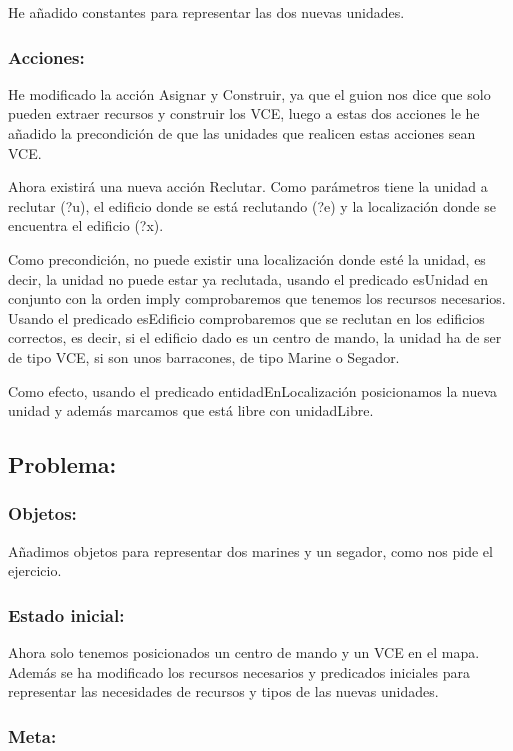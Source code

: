 \documentclass[10pt, spanish]{article}
\begin{document}
He añadido constantes para representar las dos nuevas unidades.


\subsubsection{Acciones:}

He modificado la acción Asignar y Construir, ya que el guion nos dice que solo pueden extraer recursos y construir los VCE, luego a estas dos acciones le he añadido la precondición de que las unidades que realicen estas acciones sean VCE.


Ahora existirá una nueva acción Reclutar. Como parámetros tiene la unidad a reclutar (?u), el edificio donde se está reclutando (?e) y la localización donde se encuentra el edificio (?x).

Como precondición, no puede existir una localización donde esté la unidad, es decir, la unidad no puede estar ya reclutada, usando el predicado esUnidad en conjunto con la orden imply comprobaremos que tenemos los recursos necesarios. Usando el predicado esEdificio comprobaremos que se reclutan en los edificios correctos, es decir, si el edificio dado es un centro de mando, la unidad ha de ser de tipo VCE, si son unos barracones, de tipo Marine o Segador.

Como efecto, usando el predicado entidadEnLocalización posicionamos la nueva unidad y además marcamos que está libre con unidadLibre.


\subsection{Problema:}

\subsubsection{Objetos:}

Añadimos objetos para representar dos marines y un segador, como nos pide el ejercicio.

\subsubsection{Estado inicial:}

Ahora solo tenemos posicionados un centro de mando y un VCE en el mapa. Además se ha modificado los recursos necesarios y predicados iniciales para representar las necesidades de recursos y tipos de las nuevas unidades.

\subsubsection{Meta:}
\end{document}
